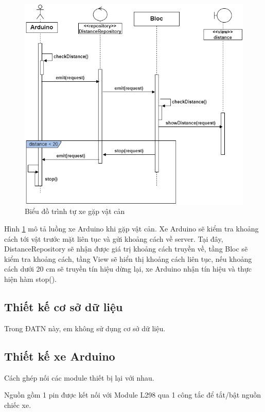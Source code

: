 \documentclass[../DoAn.tex]{subfiles}
\begin{document}
 \begin{figure}[H]
    \centering
    \includegraphics[scale = 0.6]{Hinhve/sequence_gap_vat-can.png}
    \caption{Biểu đồ trình tự xe gặp vật cản}
    \label{fig:4.2.2.4}
\end{figure}

Hình \ref{fig:4.2.2.4} mô tả luồng xe Arduino khi gặp vật cản. Xe Arduino sẽ kiểm tra khoảng cách tới vật trước mặt liên tục và gửi khoảng cách về server. Tại đây, DistanceRepository sẽ nhận được giá trị khoảng cách truyền về, tầng Bloc sẽ kiểm tra khoảng cách, tầng View sẽ hiển thị khoảng cách liên tục, nếu khoảng cách dưới 20 cm sẽ truyền tín hiệu dừng lại, xe Arduino nhận tín hiệu và thực hiện hàm stop().

\subsection{Thiết kế cơ sở dữ liệu}

Trong ĐATN này, em không sử dụng cơ sở dữ liệu.

\subsection{Thiết kế xe Arduino}

Cách ghép nối các module thiết bị lại với nhau.

Nguồn gồm 1 pin được kết nối với Module L298 qua 1 công tắc để tắt/bật nguồn chiếc xe.
\end{document}
